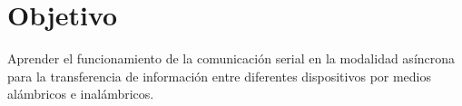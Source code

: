\section{Objetivo}
Aprender el funcionamiento de la comunicación serial en la modalidad asíncrona para la transferencia de información entre diferentes dispositivos por medios alámbricos e inalámbricos.
